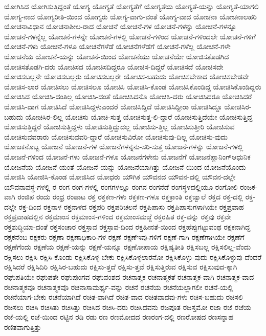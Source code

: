 {ಯೋಗಿಸಿದ
ಯೋಗಿಸುತ್ತಿದ್ದಂತೆ
ಯೋಗ್ಯ
ಯೋಗ್ಯತೆ
ಯೋಗ್ಯತೆಗೆ
ಯೋಗ್ಯತೆಯ
ಯೋಗ್ಯತೆ-ಯನ್ನು
ಯೋಗ್ಯತೆ-ಯಾಗಲಿ
ಯೋಗ್ಯ-ನಾದ
ಯೋಗ್ಯರೀತಿ-ಯಿಂದ
ಯೋಗ್ಯರು
ಯೋಗ್ಯ-ವಾಗು-ವಂತೆ
ಯೋಗ್ಯ-ವಾದ
ಯೋಚನಾ
ಯೋಚನಾಲಹರಿ
ಯೋಚನಾವಿಧಾನ
ಯೋಚನಾಶೀಲ-ರಾದ
ಯೋಚನೆ
ಯೋಚನೆ-ಗಳ
ಯೋಚನೆ-ಗಳನ್ನು
ಯೋಚನೆ-ಗಳನ್ನೂ
ಯೋಚನೆ-ಗಳನ್ನೆಲ್ಲ
ಯೋಚನೆ-ಗಳನ್ನೇ
ಯೋಚನೆ-ಗಳಲ್ಲಿ
ಯೋಚನೆ-ಗಳಿಂದ
ಯೋಚನೆ-ಗಳಿಂದಲೇ
ಯೋಚನೆ-ಗಳಿಗೆ
ಯೋಚನೆ-ಗಳು
ಯೋಚನೆ-ಗಳೂ
ಯೋಚನೆಗಳೆಡೆ
ಯೋಚನೆಗಳೆಡೆಗೆ
ಯೋಚನೆ-ಗಳೆಲ್ಲ
ಯೋಚನೆ-ಗಳೇ
ಯೋಚನೆಯ
ಯೋಚನೆ-ಯನ್ನು
ಯೋಚನೆ-ಯಿಂದ
ಯೋಚನೆಯು
ಯೋಚನೆಯೇ
ಯೋಚಿಸತೊಡಗಿದ
ಯೋಚಿಸತೊಡಗಿ-ದರು
ಯೋಚಿಸದ
ಯೋಚಿಸದಿದ್ದರೂ
ಯೋಚಿಸ-ದಿದ್ದರೆ
ಯೋಚಿಸದೆ
ಯೋಚಿಸದೇ
ಯೋಚಿಸಬಲ್ಲನೇ
ಯೋಚಿಸಬಲ್ಲರು
ಯೋಚಿಸಬಲ್ಲರೇ
ಯೋಚಿಸ-ಬಹುದು
ಯೋಚಿಸಬೇಕಾದ
ಯೋಚಿಸಬೇಡವೇ
ಯೋಚಿಸ-ಲಾರ
ಯೋಚಿಸಲು
ಯೋಚಿಸಲೂ
ಯೋಚಿಸಿ
ಯೋಚಿಸಿ-ಕೊಂಡ
ಯೋಚಿಸಿಕೊಂಡಿದ್ದ
ಯೋಚಿಸಿಕೊಂಡಿದ್ದರು
ಯೋಚಿಸಿದ
ಯೋಚಿಸಿ-ದಂತಿಲ್ಲ
ಯೋಚಿಸಿ-ದಂತೆ
ಯೋಚಿಸಿದನೊ
ಯೋಚಿಸಿ-ದರು
ಯೋಚಿಸಿದರೂ
ಯೋಚಿಸಿದರೆ
ಯೋಚಿಸಿ-ದಾಗ
ಯೋಚಿಸಿದೆ
ಯೋಚಿಸಿದ್ದಳುಎಂದರೆ
ಯೋಚಿಸಿದ್ದಿದೆ
ಯೋಚಿಸಿದ್ದೀರಾ
ಯೋಚಿಸಿದ್ದೂ
ಯೋಚಿಸಿರ-ಬಹುದು
ಯೋಚಿಸಿರ-ಲಿಲ್ಲ
ಯೋಚಿಸು
ಯೋಚಿ-ಸುತ್ತ
ಯೋಚಿಸುತ್ತ-ಲಿ-ದ್ದಾರೆ
ಯೋಚಿಸುತ್ತಿದೆಯೇ
ಯೋಚಿಸುತ್ತಿದ್ದ
ಯೋಚಿಸುತ್ತಿದ್ದರೆ
ಯೋಚಿಸುತ್ತಿದ್ದಳು
ಯೋಚಿಸುತ್ತಿದ್ದುದಲ್ಲ
ಯೋಚಿಸು-ತ್ತಿಲ್ಲ
ಯೋಚಿಸುತ್ತೀರಿ
ಯೋಚಿಸುವ
ಯೋಚಿಸುವವರಾರು
ಯೋಚಿಸುವವರಿ-ದ್ದಾರೆ
ಯೋಚಿಸುವಿರೋ
ಯೋಚಿಸುವು-ದಿಲ್ಲ
ಯೋಚಿಸು-ವುದು
ಯೋಜಕನೊಬ್ಬ
ಯೋಜನೆ
ಯೋಜನೆ-ಗಳ
ಯೋಜನೆಗಳನ್ನನು-ಸರಿ-ಸುತ್ತ
ಯೋಜನೆ-ಗಳನ್ನು
ಯೋಜನೆ-ಗಳಲ್ಲಿ
ಯೋಜನೆ-ಗಳಿಂದ
ಯೋಜನೆ-ಗಳು
ಯೋಜನೆ-ಗಳೂ
ಯೋಜನೆಗಳೇನು
ಯೋಜನೆಗೆ
ಯೋಜನೆಪ್ಲಾನಿಂಗ್ಆಧುನಿಕ
ಯೋಜನೆಯ
ಯೋಜನೆ-ಯಂತೆ
ಯೋಜನೆ-ಯನ್ನು
ಯೋಜನೆಯಾಗಿತ್ತು
ಯೋಜನೆ-ಯಿಂದ
ಯೋಜನೆಯೊಂದು
ಯೋಜಿಸಿ
ಯೋಜಿಸಿ-ಕೊಂಡ
ಯೋಜಿಸಿದ
ಯೋಧರು
ಯೌಗಿಕ
ಯೌವನದ
ಯೌವನ-ದಲ್ಲಿ
ಯೌವನ-ದಲ್ಲೇ
ಯೌವನಾವಸ್ಥೆ-ಗಳಲ್ಲಿ
ರ
ರಂಗ
ರಂಗ-ಗಳಲ್ಲಿ
ರಂಗಗಳಲ್ಲೂ
ರಂಗನ
ರಂಗನೆಡೆ
ರಂಗಸ್ಥಳದಲ್ಲಿಯೂ
ರಂಗೋಲಿ
ರಂಜಕ-ವಾಗಿ
ರಂಜಿಪ
ರಂದು
ರಂಧ್ರ
ರಂಪಾಟ
ರಕ್ತ
ರಕ್ತಕಣ-ಗಳು
ರಕ್ತಕಣ-ಗಳೂ
ರಕ್ತಕ್ರಾಂತಿ
ರಕ್ತಜ್ವಾಲೆ
ರಕ್ತದ
ರಕ್ತ-ದಲ್ಲಿ
ರಕ್ತ-ದಲ್ಲೇ
ರಕ್ತ-ದಿಂದ
ರಕ್ತನಾಳ
ರಕ್ತನಾಳದ
ರಕ್ತಪರಿ
ರಕ್ತಪರಿಚಲನೆ
ರಕ್ತಪಿಪಾಸು
ರಕ್ತಪಿಪಾಸುಗಳಾಗಿಯೇ
ರಕ್ತಪ್ರವಾಹ
ರಕ್ತಪ್ರವಾಹದಲ್ಲಿನ
ರಕ್ತಮಾಂಸ
ರಕ್ತಮಾಂಸ-ಗಳಿಂದ
ರಕ್ತಮಾಂಸಮಜ್ಜೆ
ರಕ್ತರಹಿತ
ರಕ್ತ-ವನ್ನು
ರಕ್ತವು
ರಕ್ತವೇ
ರಕ್ತಶುದ್ಧಿಯಾ-ದಂತೆ
ರಕ್ತಸಂಚಾರ
ರಕ್ತಸ್ರಾವ
ರಕ್ತಸ್ರಾವ-ದಿಂದ
ರಕ್ತಹೀನತೆ-ಯಿಂದ
ರಕ್ತಹೆಪ್ಪುಗಟ್ಟುವಂಥ
ರಕ್ಷಕನಾಗಿದ್ದ
ರಕ್ಷಕನೆಂಬ
ರಕ್ಷಕರು
ರಕ್ಷಣಾ
ರಕ್ಷಣಾಧಿಕಾರಿ-ಗಳ
ರಕ್ಷಣೆ
ರಕ್ಷಣೆಇವು-ಗಳಿಗೆ
ರಕ್ಷಣೆ-ಗಾಗಿ
ರಕ್ಷಣೆಗಾಗಿಯೇ
ರಕ್ಷಣೆಗೆ
ರಕ್ಷಣೆಗೆಂದು
ರಕ್ಷಣೆಯ
ರಕ್ಷಣೆ-ಯನ್ನು
ರಕ್ಷಣೆ-ಯನ್ನೂ
ರಕ್ಷಣೋಪಾಯ
ರಕ್ಷಿಷ್ಯತೀತಿ
ರಕ್ಷಿಸಬಲ್ಲ
ರಕ್ಷಿಸಲಿಲ್ಲ-ವೆಂದು
ರಕ್ಷಿಸಲು
ರಕ್ಷಿಸಿ
ರಕ್ಷಿಸಿ-ಕೊಂಡು
ರಕ್ಷಿಸಿಕೊಳ್ಳ-ಬೇಕು
ರಕ್ಷಿಸಿಕೊಳ್ಳಲಾರನೋ
ರಕ್ಷಿಸಿಕೊಳ್ಳು-ವುದು
ರಕ್ಷಿಸಿಕೊಳ್ಳುವು-ದೆಂದರೆ
ರಕ್ಷಿಸಿದರೆ
ರಕ್ಷಿಸಿದಿರಿ
ರಕ್ಷಿಸಿರ-ಬಹುದು
ರಕ್ಷಿಸು-ತ್ತದೆ
ರಕ್ಷಿಸು-ತ್ತವೆ
ರಕ್ಷಿಸುತ್ತಿರುವ
ರಕ್ಷಿಸುವ
ರಕ್ಷಿಸುವುದ-ಕ್ಕಾಗಿ
ರಘುಪತಿಯೇ
ರಘುಪತೇ
ರಘುಪುಂಗವ
ರಘುವಂಶದ
ರಚನಾತ್ಮಕ
ರಚನಾತ್ಮಕತೆ
ರಚನಾತ್ಮಕ-ವಾಗಿ
ರಚನಾತ್ಮಕ-ವಾದ
ರಚನಾತ್ಮಕವೂ
ರಚನಾತ್ಮಕವೊ
ರಚನಾಸಾಮರ್ಥ್ಯ-ವನ್ನು
ರಚನೆ
ರಚನೆಯ
ರಚನೆಯಲ್ಲಾಗಲೀ
ರಚನೆ-ಯಲ್ಲಿ
ರಚನೆಯಾಗ-ಬೇಕು
ರಚನೆಯಾಗಿದೆ
ರಚಿತ-ವಾಗಿದೆ
ರಚಿತ-ವಾದ
ರಚಿತವಾದವು-ಗಳು
ರಚಿಸ-ಬಹುದು
ರಚಿಸಲಿ
ರಚಿಸಲು
ರಚಿಸಿ
ರಚಿಸಿತು
ರಚಿಸಿತ್ತು
ರಚಿಸಿದ
ರಚಿಸಿ-ದರು
ರಚಿಸಿದವನು
ರಜಪೂತ
ರಜಸ್ತಮೋ
ರಜಾ
ರಜೆ
ರಜೆಯ
ರಜೆ-ಯಲ್ಲಿ
ರಜೆ-ಯಿಂದ
ರಟ್ಟಿನ
ರಡಿ
ರಡು
ರಣ
ರಣಮೋದದ
ರಣರಂಗ-ದಲ್ಲಿ
ರಣರೋಷದ
ರಣಸನ್ನಾಹ
ರಣಿತವಾಗುತ್ತಿತ್ತು
}
